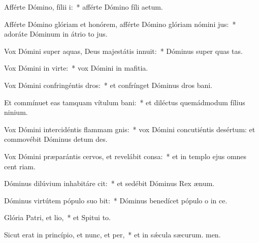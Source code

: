 \item Afférte Dómino, fílii i:~* afférte Dómino fíli aetum.
\item Afférte Dómino glóriam et honórem, afférte Dómino glóriam nómini jus:~* adoráte Dóminum in átrio to jus.
\item Vox Dómini super aquas, Deus majestátis innuit:~* Dóminus super quas tas.
\item Vox Dómini in virte:~* vox Dómini in mafitia.
\item Vox Dómini confringéntis dros:~* et confrínget Dóminus dros bani.
\item Et commínuet eas tamquam vítulum bani:~* et diléctus quemádmodum fílius ninium.
\item Vox Dómini intercidéntis flammam gnis:~* vox Dómini concutiéntis desértum: et commovébit Dóminus detum des.
\item Vox Dómini præparántis cervos, et revelábit consa:~* et in templo ejus omnes cent riam.
\item Dóminus dilúvium inhabitáre cit:~* et sedébit Dóminus Rex  ænum.
\item Dóminus virtútem pópulo suo bit:~* Dóminus benedícet pópulo o in ce.
\item Glória Patri, et lio,~* et Spitui to.
\item Sicut erat in princípio, et nunc, et per,~* et in sǽcula sæcurum. men.
